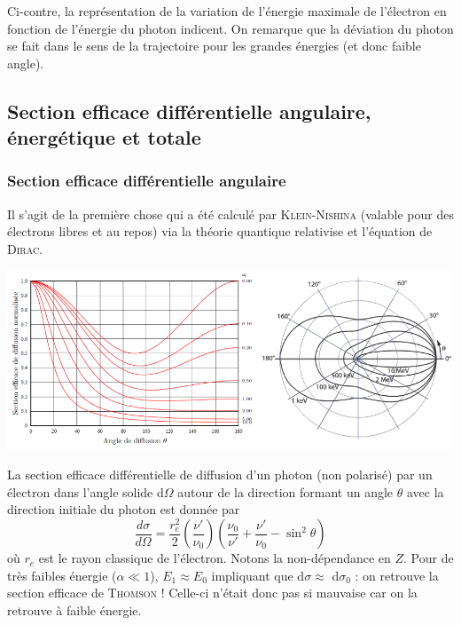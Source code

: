 Ci-contre, la représentation de la variation de l'énergie maximale de l'électron en fonction 
de l'énergie du photon indicent. On remarque que la déviation du photon se fait dans le sens
de la trajectoire pour les grandes énergies (et donc faible angle).\\



\subsection{Section efficace différentielle angulaire, énergétique et totale}
\subsubsection{Section efficace différentielle angulaire} %
Il s'agit de la première chose qui a été calculé par \textsc{Klein-Nishina} (valable pour 
des électrons libres et au repos) via la théorie quantique relativise et l'équation de
\textsc{Dirac}.

\begin{center}
	\includegraphics[scale=0.6]{ch4/image5}
\end{center}

\newpage
La section efficace différentielle de diffusion d'un photon (non polarisé) par un électron dans
l'angle solide d$\Omega$ autour de la direction formant un angle $\theta$ avec la direction initiale
du photon est donnée par 
\begin{equation}
\frac{d\sigma}{d\Omega}=\frac{r_e^2}{2}\left(\frac{\nu'}{\nu_0}\right)\left(\frac{\nu_0}{\nu'}+\frac{\nu'}{\nu_0}-\sin^2\theta\right)
\end{equation}
où $r_e$ est le rayon classique de l'électron. Notons la non-dépendance en $Z$. Pour de très faibles
énergie ($\alpha\ll 1$), $E_1\approx E_0$ impliquant que d$\sigma \approx$ d$\sigma_0$ : on 
retrouve la section efficace de \textsc{Thomson} ! Celle-ci n'était donc pas si mauvaise car on la
retrouve à faible énergie.

